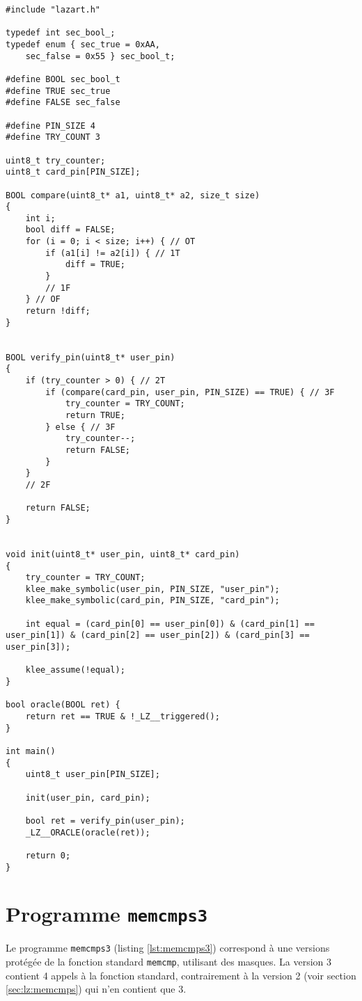 \begin{lstlisting}
#include "lazart.h"

typedef int sec_bool_;
typedef enum { sec_true = 0xAA,
    sec_false = 0x55 } sec_bool_t;

#define BOOL sec_bool_t
#define TRUE sec_true
#define FALSE sec_false

#define PIN_SIZE 4
#define TRY_COUNT 3

uint8_t try_counter;
uint8_t card_pin[PIN_SIZE];

BOOL compare(uint8_t* a1, uint8_t* a2, size_t size)
{
    int i;
    bool diff = FALSE;
    for (i = 0; i < size; i++) { // OT
        if (a1[i] != a2[i]) { // 1T
            diff = TRUE;
        }
        // 1F
    } // OF
    return !diff;
}


BOOL verify_pin(uint8_t* user_pin)
{
    if (try_counter > 0) { // 2T
        if (compare(card_pin, user_pin, PIN_SIZE) == TRUE) { // 3F
            try_counter = TRY_COUNT;
            return TRUE;
        } else { // 3F
            try_counter--;
            return FALSE;
        }
    }
    // 2F

    return FALSE;
}


void init(uint8_t* user_pin, uint8_t* card_pin)
{
    try_counter = TRY_COUNT;
    klee_make_symbolic(user_pin, PIN_SIZE, "user_pin");
    klee_make_symbolic(card_pin, PIN_SIZE, "card_pin");

    int equal = (card_pin[0] == user_pin[0]) & (card_pin[1] == user_pin[1]) & (card_pin[2] == user_pin[2]) & (card_pin[3] == user_pin[3]);

    klee_assume(!equal);
}

bool oracle(BOOL ret) { 
    return ret == TRUE & !_LZ__triggered();
}

int main()
{
    uint8_t user_pin[PIN_SIZE];

    init(user_pin, card_pin);

    bool ret = verify_pin(user_pin);
    _LZ__ORACLE(oracle(ret));

    return 0;
}
\end{lstlisting}

    \section{Programme \texttt{memcmps3}}
    \label{annexe:prgm:memcmps3}
        Le programme \texttt{memcmps3} (listing \ref{lst:memcmps3}) correspond à une versions protégée de la fonction standard \texttt{memcmp}, utilisant des masques.
        La version 3 contient 4 appels à la fonction standard, contrairement à la version 2 (voir section \ref{sec:lz:memcmps}) qui n'en contient que 3.
    
